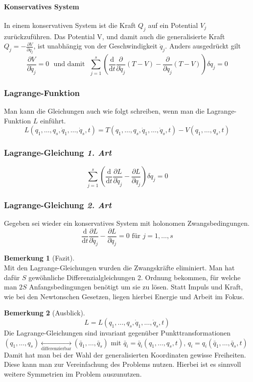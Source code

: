 \documentclass[oneside]{book}
\theoremstyle{definition}
\newtheorem*{bemerkung*}{Bemerkung}
\renewcommand{\d}{\mathrm d}
\newcommand{\dd}[1]{\frac{\d}{\d #1}}
\newcommand{\fpartial}[1]{\frac{\partial}{\partial #1}}
\newcommand{\ffpartial}[2]{\frac{\partial #1}{\partial #2}}
\newcommand{\vardots}[2]{#1_1, \dots, #1_#2}
\begin{document}
\paragraph{Konservatives System}
In einem konservativen System ist die Kraft $Q_j$ auf ein Potential $V_j$ zurückzuführen. Das Potential V, und damit auch die generalisierte Kraft $Q_j = - \ffpartial{V}{q_j}$, ist unabhängig von der Geschwindigkeit $\dot{q}_j$. Anders ausgedrückt gilt
$$\ffpartial{V}{\dot q_j} = 0 \text{~ und damit ~} \sum_{j=1}^s \left(  \dd{t} \fpartial{\dot{q}_j} (T-V) - \fpartial{q_j} (T -V) \right) \delta q_j = 0$$

\subsubsection{Lagrange-Funktion}
Man kann die Gleichungen auch wie folgt schreiben, wenn man die Lagrange-Funktion $L$ einführt.
$$L(q_1, \dots, q_s, \dot{q}_1, \dots, \dot{q}_s, t) = T(q_1, \dots, q_s, \dot{q}_1, \dots, \dot{q}_s, t) - V(q_1, \dots, q_s, t)$$

\subsubsection{Lagrange-Gleichung \textit{1. Art}}
$$\sum_{j = 1}^s  (  \dd{t} \ffpartial{L}{\dot{q}_j} - \ffpartial{L}{q_j}  ) \delta q_j = 0$$

\subsubsection{Lagrange-Gleichung \textit{2. Art}}
Gegeben sei wieder ein konservatives System mit holonomen Zwangsbedingungen.
$$ \dd{t} \ffpartial{L}{\dot{q}_j} - \ffpartial{L}{q_j} = 0 \text{~für~} j= 1, \dots, s$$

\begin{bemerkung*}[Fazit]~\\
	Mit den Lagrange-Gleichungen wurden die Zwangskräfte eliminiert. Man hat dafür $S$ gewöhnliche Differenzialgleichungen 2. Ordnung bekommen, für welche man $2S$ Anfangsbedingungen benötigt um sie zu lösen.
	Statt Impuls und Kraft, wie bei den Newtonschen Gesetzen, liegen hierbei Energie und Arbeit im Fokus.
\end{bemerkung*}

\begin{bemerkung*}[Ausblick]
	$$L = L(\vardots{q}{s}, \vardots{\dot{q}}{s}, t)$$
	Die Lagrange-Gleichungen sind invariant gegenüber Punkttransformationen \\
	$(\vardots{q}{s}) \underset{\text{differenzierbar}}{\leftrightarrow} (\vardots{\bar{q}}{s})$ mit $\bar{q}_i = \bar{q}_i(\vardots{q}{s}, t)$, $q_i = q_i(\vardots{\bar{q}}{s}, t)$
	Damit hat man bei der Wahl der generalisierten Koordinaten gewisse Freiheiten. Diese kann man zur Vereinfachung des Problems nutzen. Hierbei ist es sinnvoll weitere Symmetrien im Problem auszunutzen.
\end{bemerkung*}
\end{document}
